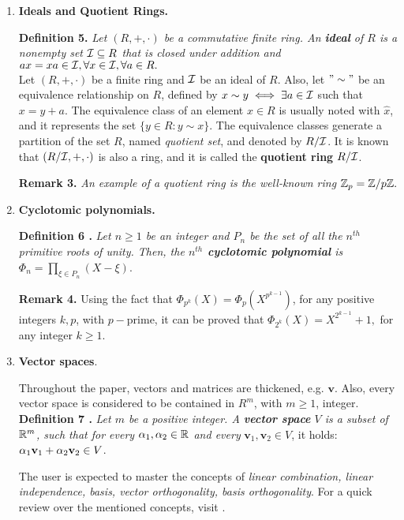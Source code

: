 \begin{enumerate}
	\item \textbf{Ideals and Quotient Rings.} 
	
	\textbf{Definition 5.} \textit{Let $(R, +, \cdot)$ be a commutative finite ring. An \textbf{ideal} of $R$ is a nonempty set $\mathcal{I} \subseteq R$ that is closed under addition and $ax=xa \in \mathcal{I}, \forall x \in \mathcal{I}, \forall a \in R.$} \\
	
	Let $(R, +, \cdot)$ be a finite ring and $\mathcal{I}$ be an ideal of $R$. Also, let $"\sim"$ be an equivalence relationship on $R$, defined by $x \sim y \iff \exists a\in \mathcal{I} $ such that $x = y + a$. The equivalence class of an element $x \in R$ is usually noted with $\hat{x}$, and it represents the set $\{y \in R : y \sim x\}$. The equivalence classes generate a partition of the set $R$, named \textit{quotient set}, and denoted by $R/\mathcal{I}$. It is known that $(R/\mathcal{I}, +, \cdot)$ is also a ring, and it is called the \textbf{quotient ring} $R/\mathcal{I}$.
	
	\textbf{Remark 3.} \textit{An example of a quotient ring is the well-known ring ${\mathbb Z}_p = {\mathbb Z}/p{\mathbb Z}.$}
	
	\item \textbf{Cyclotomic polynomials.}
	
	\textbf{Definition 6 \cite{BB15}.} \textit{Let $n \geq 1$ be an integer and $P_n $ be the set of all the $n^{th}$ primitive roots of unity. Then, the \textbf{$n^{th}$ cyclotomic polynomial} is $\Phi_n = \displaystyle{\prod_{\xi \in P_n}}(X-\xi)$}.
	
	\textbf{Remark 4.} Using the fact that $\Phi_{p^k}(X) = \Phi_p(X^{p^{k-1}})$, for any positive integers $k, p$, with $p-$prime, it can be proved that $\Phi_{2^k}(X) = X^{2^{k-1}} + 1,$ for any integer $k \geq 1$.
	
	\item \textbf{Vector spaces}.
	
	Throughout the paper, vectors and matrices are thickened, e.g. $\textbf{v}$. Also, every vector space is considered to be contained in $R^m$, with $m \geq 1$, integer.\\
	
	\textbf{Definition 7 \cite{HPS08}.} \textit{Let $m$ be a positive integer. A \textbf{vector space} $V$ is a subset of $\mathbb{R}^m$, such that for every $\alpha_1, \alpha_2 \in \mathbb{R}$ and every} $\textbf{v}_1, \textbf{v}_2 \in V$, it holds: $\alpha_1 \textbf{v}_1 + \alpha_2 \textbf{v}_2\in V$.
	
	The user is expected to master the concepts of \textit{linear combination, linear independence, basis, vector orthogonality, basis orthogonality}. For a quick review over the mentioned concepts, visit \cite{HPS08}.\\
	

\end{enumerate}
